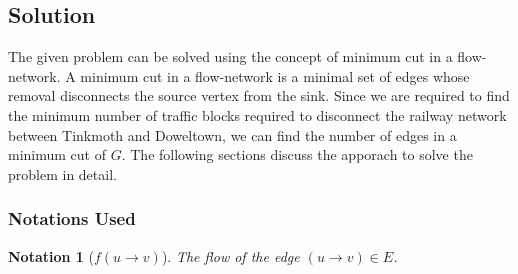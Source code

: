 \documentclass[12pt]{report}
\newtheorem{notation}{Notation}
\begin{document}
    \subsection*{Solution}
    The given problem can be solved using the concept of minimum cut in a flow-network.
    A minimum cut in a flow-network is a minimal set of edges whose removal disconnects the source vertex from the sink.
    Since we are required to find the minimum number of traffic blocks required to disconnect the railway network between Tinkmoth and Doweltown,
    we can find the number of edges in a minimum cut of $G$.
    The following sections discuss the apporach to solve the problem in detail.

    \subsubsection*{Notations Used}
    \begin{notation}[$f(u \to v)$]
        The flow of the edge $(u \to v) \in E$.
    \end{notation}
\end{document}
